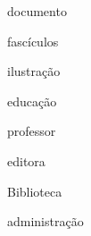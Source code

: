 \begin{abreviaturas}
  \item[doc.] documento
  \item[fasc.] fascículos
  \item[il.] ilustração
  \item[educ.] educação
  \item[prof.] professor
  \item[ed.] editora
  \item[biblio.] Biblioteca
  \item[adm.] administração
\end{abreviaturas}
